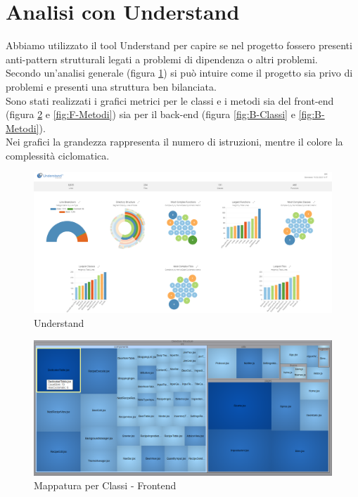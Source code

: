 \documentclass[a4paper,12pt]{report}
\begin{document}
      	\section{Analisi con Understand}
	Abbiamo utilizzato il tool Understand per capire se nel progetto fossero presenti anti-pattern strutturali legati a problemi di dipendenza o altri problemi.\\
Secondo un'analisi generale (figura \ref{fig:understand}) si può intuire come il progetto sia privo di problemi e presenti una struttura ben bilanciata.\\
Sono stati realizzati i grafici metrici per le classi e i metodi sia del front-end (figura \ref{fig:F-Classi} e \ref{fig:F-Metodi}) sia per il back-end (figura \ref{fig:B-Classi} e \ref{fig:B-Metodi}).\\
Nei grafici la grandezza rappresenta il numero di istruzioni, mentre il colore la complessità ciclomatica.\\
		\begin{figure}[!h]
			\centering
			\includegraphics[width=1\linewidth]{image/understand.png}
			\caption{Understand}\label{fig:understand}
		\end{figure}
		
		\begin{figure}[!h]
			\centering
			\includegraphics[width=1\linewidth]{image/F-Classi.png}
			\caption{Mappatura per Classi - Frontend}\label{fig:F-Classi}
		\end{figure}    
\end{document}
